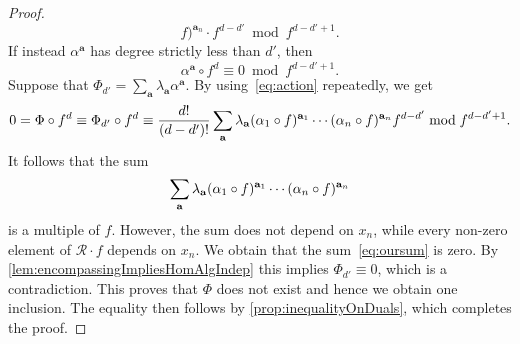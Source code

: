 \documentclass[a4paper,11pt,reqno]{amsart}
\newcommand{\bfa}{\mathbf{a}}
\newcommand{\calR}{\mathcal{R}}
\numberwithin{equation}{section}
\theoremstyle{definition}
\theoremstyle{plain}
\theoremstyle{remark}
\begin{document}
\begin{proof}
\begin{equation}
        f)^{\bfa_{n}}\cdot f^{d-d'} \bmod{f^{d-d'+1}}.
    \end{equation}
    If instead $\alpha^{\bfa}$ has degree strictly less than $d'$, then
    \[
    \alpha^{\bfa} \circ f^d \equiv 0 \bmod{f^{d-d'+1}}.
    \]
    Suppose that $\Phi_{d'} = \sum_{\bfa}
    \lambda_{\bfa}\alpha^{\bfa}$.
    {By using~\eqref{eq:action} repeatedly,} we get
    \[
        0 = \Phi\circ f^{d} \equiv \Phi_{d'}\circ f^{d} \equiv \frac{d!}{(d-d')!}\oursum f^{d-d'}\bmod{f^{d-d'+1}}.
    \]
    It follows that the sum
    \begin{equation}\label{eq:oursum}
        \oursum
    \end{equation}
    is a multiple of $f$. However, the sum does not depend on $x_n$, while {every}
    non-zero element of
    $\calR\cdot f$ depends on $x_n$. We obtain that the
    sum~\eqref{eq:oursum} is zero. By
    \autoref{lem:encompassingImpliesHomAlgIndep} this implies $\Phi_{d'}\equiv
    0$, which is a contradiction. This proves that $\Phi$ does not exist and hence we {obtain one inclusion}. The equality then follows by  \autoref{prop:inequalityOnDuals}, which completes the proof.
\end{proof}
\end{document}
